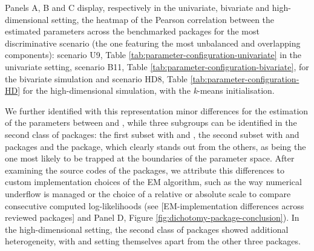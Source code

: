 Panels A, B and C display, respectively in the univariate, bivariate and high-dimensional setting, the heatmap of the Pearson correlation between the estimated parameters across the benchmarked packages for the most discriminative scenario (the one featuring the most unbalanced and overlapping components): scenario U9, Table \ref{tab:parameter-configuration-univariate} in the univariate setting, scenario B11, Table \ref{tab:parameter-configuration-bivariate}, for the bivariate simulation and scenario HD8, Table \ref{tab:parameter-configuration-HD} for the high-dimensional simulation, with the \emph{k}-means initialisation.

We further identified with this representation minor differences for the estimation of the parameters between  and , while three subgroups can be identified in the second class of packages: the first subset with  and , the second subset with  and  packages and the  package, which clearly stands out from the others, as being the one most likely to be trapped at the boundaries of the parameter space. After examining the source codes of the packages, we attribute this differences to custom implementation choices of the EM algorithm, such as the way numerical underflow is managed or the choice of a relative or absolute scale to compare consecutive computed log-likelihoods (see {[}EM-implementation differences across reviewed packages{]} and Panel D, Figure \ref{fig:dichotomy-package-conclusion}). In the high-dimensional setting, the second class of packages showed additional heterogeneity, with  and  setting themselves apart from the other three packages.

